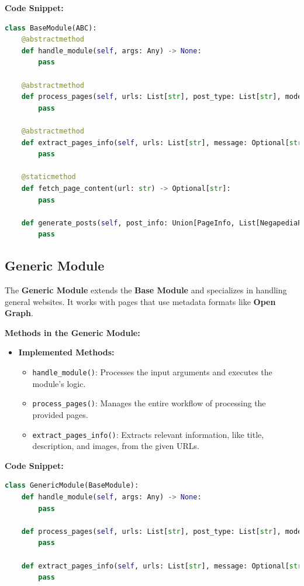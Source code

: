 \textbf{Code Snippet:}
\begin{lstlisting}[language=Python, caption={Base Module}, label={lst:base_module}]
class BaseModule(ABC):
    @abstractmethod
    def handle_module(self, args: Any) -> None:
        pass
    
    @abstractmethod
    def process_pages(self, urls: List[str], post_type: List[str], mode: str, remove_suffix: Optional[bool], base_directory: Optional[str], base_url: Optional[str], minimum_article_modified_date: Optional[str], message: Optional[str]) -> None:
        pass
    
    @abstractmethod
    def extract_pages_info(self, urls: List[str], message: Optional[str], mode: str) -> Union[PageInfo, List[NegapediaPageInfo]]:
        pass
    
    @staticmethod
    def fetch_page_content(url: str) -> Optional[str]:
        pass

    def generate_posts(self, post_info: Union[PageInfo, List[NegapediaPageInfo]], post_type: List[str], mode: str) -> None:
        pass
\end{lstlisting}

\subsection{Generic Module}
\label{subsec:generic_module}
The \textbf{Generic Module} extends the \textbf{Base Module} and specializes in handling general websites. It works with pages that use metadata formats like \textbf{Open Graph}.

\textbf{Methods in the Generic Module:}
\begin{itemize}
    \item \textbf{Implemented Methods:}
    \begin{itemize}
        \item \texttt{handle\_module()}: Processes the input arguments and executes the module's logic.
        \item \texttt{process\_pages()}: Manages the entire workflow of processing the provided pages.
        \item \texttt{extract\_pages\_info()}: Extracts relevant information, like title, description, and images, from the given URLs.
    \end{itemize}
\end{itemize}

\textbf{Code Snippet:}
\begin{lstlisting}[language=Python, caption={Generic Module}, label={lst:generic_module}]
class GenericModule(BaseModule):
    def handle_module(self, args: Any) -> None:
        pass
    
    def process_pages(self, urls: List[str], post_type: List[str], mode: str, remove_suffix: Optional[bool], base_directory: Optional[str], base_url: Optional[str], minimum_article_modified_date: Optional[str], message: Optional[str]) -> None:
        pass
    
    def extract_pages_info(self, urls: List[str], message: Optional[str], mode: str) -> PageInfo:
        pass
\end{lstlisting}

